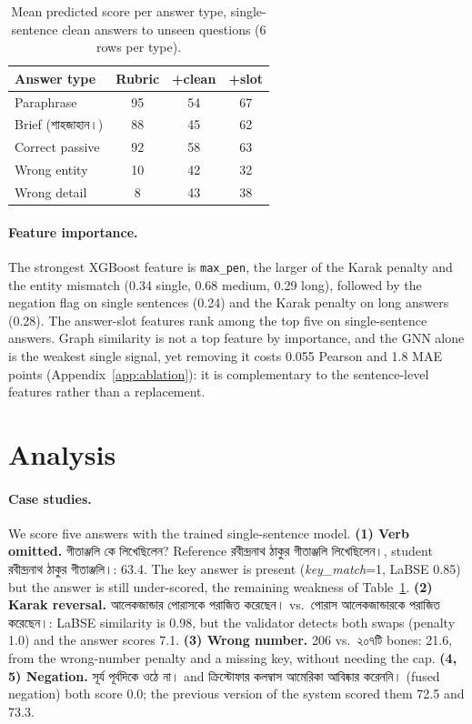 \documentclass[10pt,a4paper,twocolumn]{article}
\newcommand{\bn}[1]{{\bengalifont #1}}
\begin{document}
\begin{table}[t]
\centering\small
\begin{tabular}{lccc}
\toprule
Answer type & Rubric & +clean & +slot \\
\midrule
Paraphrase & 95 & 54 & 67 \\
Brief (\bn{শাহজাহান।}) & 88 & 45 & 62 \\
Correct passive & 92 & 58 & 63 \\
Wrong entity & 10 & 42 & 32 \\
Wrong detail & 8 & 43 & 38 \\
\bottomrule
\end{tabular}
\caption{Mean predicted score per answer type, single-sentence clean answers to unseen questions (6 rows per type).}
\label{tab:types}
\end{table}

\paragraph{Feature importance.}
The strongest XGBoost feature is \texttt{max\_pen}, the larger of the Karak
penalty and the entity mismatch (0.34 single, 0.68 medium, 0.29 long),
followed by the negation flag on single sentences (0.24) and the Karak
penalty on long answers (0.28). The answer-slot features rank among the top
five on single-sentence answers. Graph similarity is not a top feature by
importance, and the GNN alone is the weakest single signal, yet removing it
costs 0.055 Pearson and 1.8 MAE points (Appendix~\ref{app:ablation}): it is
complementary to the sentence-level features rather than a replacement.

\section{Analysis}
\paragraph{Case studies.}
We score five answers with the trained single-sentence model.
\textbf{(1) Verb omitted.} \bn{গীতাঞ্জলি কে লিখেছিলেন?} Reference
\bn{রবীন্দ্রনাথ ঠাকুর গীতাঞ্জলি লিখেছিলেন।}, student \bn{রবীন্দ্রনাথ ঠাকুর
গীতাঞ্জলি।}: 63.4. The key answer is present (\emph{key\_match}=1, LaBSE 0.85)
but the answer is still under-scored, the remaining weakness of
Table~\ref{tab:types}. \textbf{(2) Karak reversal.} \bn{আলেকজান্ডার পোরাসকে
পরাজিত করেছেন।} vs.\ \bn{পোরাস আলেকজান্ডারকে পরাজিত করেছেন।}: LaBSE
similarity is 0.98, but the validator detects both swaps (penalty 1.0) and
the answer scores 7.1. \textbf{(3) Wrong number.} 206 vs.\ \bn{২০৭টি} bones:
21.6, from the wrong-number penalty and a missing key, without needing the
cap. \textbf{(4, 5) Negation.} \bn{সূর্য পূর্বদিকে ওঠে না।} and
\bn{ক্রিস্টোফার কলম্বাস আমেরিকা আবিষ্কার করেননি।} (fused negation) both
score 0.0; the previous version of the system scored them 72.5 and 73.3.
\end{document}
